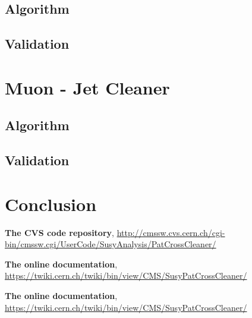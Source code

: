 \documentclass{cmspaper}
\begin{document}
\subsection{Algorithm}
\subsection{Validation}

\section{Muon - Jet Cleaner}
\subsection{Algorithm}
\subsection{Validation}

\section{Conclusion}


\pagebreak
\begin{thebibliography}{9}
   {\bf The CVS code repository},
    \underline{http://cmssw.cvs.cern.ch/cgi-bin/cmssw.cgi/UserCode/SusyAnalysis/PatCrossCleaner/}

   {\bf The online documentation},
    \underline{https://twiki.cern.ch/twiki/bin/view/CMS/SusyPatCrossCleaner/}

   {\bf The online documentation},
    \underline{https://twiki.cern.ch/twiki/bin/view/CMS/SusyPatCrossCleaner/}

\end{thebibliography}
 
\end{document}
